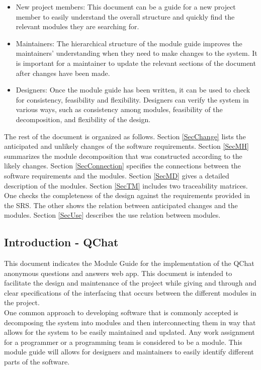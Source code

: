 \documentclass[12pt, titlepage]{article}
\begin{document}
\begin{itemize}
\item New project members: This document can be a guide for a new project member
  to easily understand the overall structure and quickly find the
  relevant modules they are searching for.
\item Maintainers: The hierarchical structure of the module guide improves the
  maintainers' understanding when they need to make changes to the system. It is
  important for a maintainer to update the relevant sections of the document
  after changes have been made.
\item Designers: Once the module guide has been written, it can be used to
  check for consistency, feasibility and flexibility. Designers can verify the
  system in various ways, such as consistency among modules, feasibility of the
  decomposition, and flexibility of the design.
\end{itemize}

The rest of the document is organized as follows. Section
\ref{SecChange} lists the anticipated and unlikely changes of the software
requirements. Section \ref{SecMH} summarizes the module decomposition that
was constructed according to the likely changes. Section \ref{SecConnection}
specifies the connections between the software requirements and the
modules. Section \ref{SecMD} gives a detailed description of the
modules. Section \ref{SecTM} includes two traceability matrices. One checks
the completeness of the design against the requirements provided in the SRS. The
other shows the relation between anticipated changes and the modules. Section
\ref{SecUse} describes the use relation between modules.

\subsection{Introduction - QChat}

This document indicates the Module Guide for the implementation of the QChat anonymous questions and answers web app. This document is intended to facilitate the design and maintenance of the project while giving and through and clear specifications of the interfacing that occurs between the different modules in the project.\\

One common approach to developing software that is commonly accepted is decomposing the system into modules and then interconnecting them in way that allows for the system to be easily maintained and updated. Any work assignment for a programmer or a programming team is considered to be a module. This module guide will allows for designers and maintainers to easily identify different parts of the software. \\
 
\end{document}
